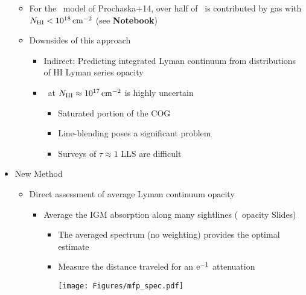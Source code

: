 \documentclass[12pt,letterpaper]{article}
\begin{document}
\begin{Aenumerate}
\begin{itemize}
\begin{itemize}
  	\item For the \fnhi\ model of Prochaska+14, over
  	half of \tll\ is contributed by gas with $N_{\rm HI} < 10^{18} \, {\rm cm^{-2}}$
  	(see {\bf Notebook})
  	\item Downsides of this approach 
  		\begin{itemize}
  		\item Indirect: Predicting integrated Lyman continuum from
  		distributions of HI Lyman series opacity
  		\item \fnhi\ at $N_{\rm HI} \approx 10^{17} \, {\rm cm^{-2}}$ is highly uncertain
  			\begin{itemize}
  			\item Saturated portion of the COG
  			\item Line-blending poses a significant problem
  			\item Surveys of $\tau \approx 1$ LLS are difficult
  			\end{itemize}
  		\end{itemize}
  	\end{itemize}
  \item New Method
  	\begin{itemize}
  	\item Direct assessment of average Lyman continuum opacity
  	  \begin{itemize}
  	  \item Average the IGM absorption along many 
  	  sightlines (\lya\ opacity Slides)
  	  	\begin{itemize}
	  	  \item The averaged spectrum (no weighting) provides 
	  	  the optimal estimate
	  	  \item Measure the distance traveled for an $\rm e^{-1}$ attenuation

\texttt{[image: Figures/mfp\_spec.pdf]}


\end{itemize}
\end{itemize}
\end{itemize}
\end{itemize}
\end{Aenumerate}
\end{document}
